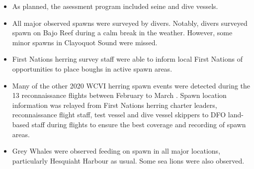 \begin{itemize}

\item As planned, the asessment program included seine and dive vessels.

\item All major observed spawns were surveyed by divers.
Notably, divers surveyed spawn on Bajo Reef during a calm break in the weather.
However, some minor spawns in Clayoquot Sound were missed.

\item First Nations herring survey staff were able to inform local First Nations of opportunities to place boughs in active spawn areas.

\item Many of the other 2020 WCVI herring spawn events were detected during the 13 reconnaissance flights between February  to March .
Spawn location information was relayed from First Nations herring charter leaders, reconnaissance flight staff, test vessel and dive vessel skippers to DFO land-based staff during flights to ensure the best coverage and recording of spawn areas.

\item Grey Whales were observed feeding on spawn in all major locations, particularly Hesquiaht Harbour as usual.
Some sea lions were also observed.

\end{itemize}
